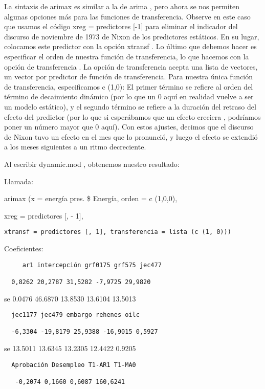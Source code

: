 \documentclass[
]{book}
\begin{document}
La sintaxis de arimax es similar a la de arima , pero ahora se nos permiten algunas opciones más para las funciones de transferencia. Observe en este caso que usamos el código xreg = predictores {[}-1{]} para eliminar el indicador del discurso de noviembre de 1973 de Nixon de los predictores estáticos. En su lugar, colocamos este predictor con la opción xtransf . Lo último que debemos hacer es especificar el orden de nuestra función de transferencia, lo que hacemos con la opción de transferencia . La opción de transferencia acepta una lista de vectores, un vector por predictor de función de transferencia. Para nuestra única función de transferencia, especificamos c (1,0): El primer término se refiere al orden del término de decaimiento dinámico (por lo que un 0 aquí en realidad vuelve a ser un modelo estático), y el segundo término se refiere a la duración del retraso del efecto del predictor (por lo que si esperábamos que un efecto creciera , podríamos poner un número mayor que 0 aquí). Con estos ajustes, decimos que el discurso de Nixon tuvo un efecto en el mes que lo pronunció, y luego el efecto se extendió a los meses siguientes a un ritmo decreciente.

Al escribir dynamic.mod , obtenemos nuestro resultado:

Llamada:

arimax (x = energía pres. \$ Energía, orden = c (1,0,0),

xreg = predictores {[}, - 1{]},

\begin{verbatim}
xtransf = predictores [, 1], transferencia = lista (c (1, 0)))
\end{verbatim}

Coeficientes:

\begin{verbatim}
     ar1 intercepción grf0175 grf575 jec477

  0,8262 20,2787 31,5282 -7,9725 29,9820
\end{verbatim}

se 0.0476 46.6870 13.8530 13.6104 13.5013

\begin{verbatim}
  jec1177 jec479 embargo rehenes oilc

  -6,3304 -19,8179 25,9388 -16,9015 0,5927
\end{verbatim}

se 13.5011 13.6345 13.2305 12.4422 0.9205

\begin{verbatim}
  Aprobación Desempleo T1-AR1 T1-MA0

   -0,2074 0,1660 0,6087 160,6241
\end{verbatim}
\end{document}
